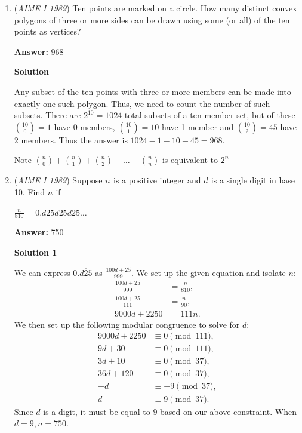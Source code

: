 \begin{enumerate}
 



\textbf{Solution 7 (Brute force)}

$31 \times 30 \times 29 \times 28$ is $755160$. $755160 + 1=755161$, and $\sqrt{755161}=869$. So the answer is $\boxed{869}$.

 


	\item (\textit{AIME I 1989}) Ten points are marked on a circle. How many distinct convex polygons of three or more sides can be drawn using some (or all) of the ten points as vertices?


 
 \textbf{Answer: }968



\textbf{Solution}

Any \href{https://artofproblemsolving.com/wiki/index.php?title=Subset}{subset} of the ten points with three or more members can be made into exactly one such polygon.  Thus, we need to count the number of such subsets.  There are $2^{10} = 1024$ total subsets of a ten-member \href{https://artofproblemsolving.com/wiki/index.php?title=Set}{set}, but of these ${10 \choose 0} = 1$ have 0 members, ${10 \choose 1} = 10$ have 1 member and ${10 \choose 2} = 45$ have 2 members.  Thus the answer is $1024 - 1 - 10 - 45 = \boxed{968}$.

 Note ${n \choose 0}+{n \choose 1} + {n \choose 2} + \dots + {n \choose n}$ is equivalent to $2^n$



	\item (\textit{AIME I 1989}) Suppose $n_{}^{}$ is a positive integer and $d_{}^{}$ is a single digit in base 10. Find $n_{}^{}$ if


 $\frac{n}{810}=0.d25d25d25\ldots$

 \textbf{Answer: }750



\textbf{Solution 1}

We can express $0.\overline{d25}$ as $\frac{100d+25}{999}$. We set up the given equation and isolate $n:$ \begin{align*} \frac{100d+25}{999} &= \frac{n}{810}, \\ \frac{100d+25}{111} &= \frac{n}{90}, \\ 9000d + 2250 &= 111n. \end{align*}
 We then set up the following modular congruence to solve for $d:$ \begin{align*}9000d + 2250 &\equiv 0 \pmod {111}, \\ 9d + 30 &\equiv 0 \pmod {111}, \\ 3d + 10 &\equiv 0 \pmod {37}, \\ 36d + 120 &\equiv 0 \pmod {37}, \\ -d &\equiv -9 \pmod {37}, \\ d &\equiv 9 \pmod {37}.\end{align*}
 Since $d$ is a digit, it must be equal to $9$ based on our above constraint. When $d=9, n = \boxed{750}.$





\end{enumerate}
